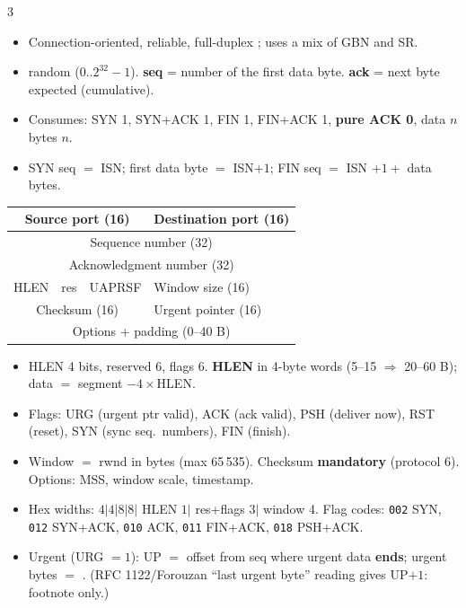 \begin{multicols*}{3}
 
\begin{itemize}
  \item Connection-oriented, reliable, full-duplex ; uses a mix of GBN and SR.
  \item {} random ($0..2^{32}-1$). \textbf{seq} = number of the first data byte. \textbf{ack} = next byte expected (cumulative).
  \item Consumes: SYN 1, SYN+ACK 1, FIN 1, FIN+ACK 1, \textbf{pure ACK 0}, data $n$ bytes $n$.
  \item SYN seq $=$ ISN; first data byte $=$ ISN$+1$; FIN seq $=$ ISN $+1+$ data bytes.
\end{itemize}

 
\begin{center}\scriptsize\renewcommand{\arraystretch}{1.15}
\begin{tabular}{|p{7mm}|p{5mm}|p{12mm}|p{33mm}|}\hline
\multicolumn{3}{|c|}{Source port (16)} & \centering Destination port (16)\tabularnewline\hline
\multicolumn{4}{|c|}{Sequence number (32)}\\\hline
\multicolumn{4}{|c|}{Acknowledgment number (32)}\\\hline
\centering HLEN & \centering res & \centering UAPRSF & \centering Window size (16)\tabularnewline\hline
\multicolumn{3}{|c|}{Checksum (16)} & \centering Urgent pointer (16)\tabularnewline\hline
\multicolumn{4}{|c|}{Options + padding (0--40 B)}\\\hline
\end{tabular}
\end{center}
\begin{itemize}
  \item HLEN 4 bits, reserved 6, flags 6. \textbf{HLEN} in 4-byte words (5--15 $\Rightarrow$ 20--60 B); data $=$ segment $-4\times$HLEN.
  \item Flags: URG (urgent ptr valid), ACK (ack valid), PSH (deliver now), RST (reset), SYN (sync seq.\ numbers), FIN (finish).
  \item Window $=$ rwnd in bytes (max 65\,535). Checksum \textbf{mandatory} (protocol 6). Options: MSS, window scale, timestamp.
  \item Hex widths: $4|4|8|8|$ HLEN $1|$ res+flags $3|$ window 4. Flag codes: \texttt{002} SYN, \texttt{012} SYN+ACK, \texttt{010} ACK, \texttt{011} FIN+ACK, \texttt{018} PSH+ACK.
  \item Urgent (URG $=1$): UP $=$ offset from seq where urgent data \textbf{ends}; urgent bytes $=$ . (RFC 1122/Forouzan ``last urgent byte'' reading gives UP$+1$: footnote only.)
\end{itemize}


\end{multicols*}
